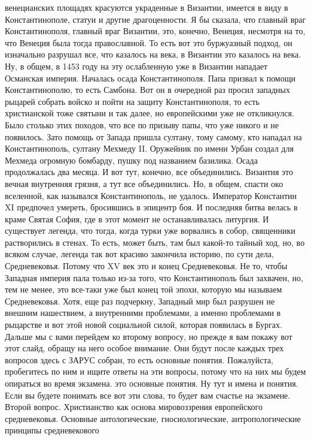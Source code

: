 венецианских площадях красуются украденные в Византии, имеется в виду в
Константинополе, статуи и другие драгоценности. Я бы сказала, что главный враг
Константинополя, главный враг Византии, это, конечно, Венеция, несмотря на то,
что Венеция была тогда православной. То есть вот это буржуазный подход, он
изначально разрушал все, что казалось на века, в Византии это казалось на века.
Ну, в общем, в 1453 году на эту ослабленную уже в Византии нападает Османская
империя. Началась осада Константинополя. Папа призвал к помощи Константинополю,
то есть Самбона. Вот он в очередной раз просил западных рыцарей собрать войско и
пойти на защиту Константинополя, то есть христианской тоже святыни и так далее,
но европейскими уже не откликнулся. Было столько этих походов, что все по
призыву папы, что уже никого и не появилось. Зато помощь от Запада пришла
султану, тому самому, кто нападал на Константинополь, султану Мехмеду II.
Оружейник по имени Урбан создал для Мехмеда огромную бомбарду, пушку под
названием базилика. Осада продолжалась два месяца. И вот тут, конечно, все
объединились. Византия это вечная внутренняя грязня, а тут все объединились. Но,
в общем, спасти око вселенной, как назывался Константинополь, не удалось.
Император Константин XI предпочел умереть, бросившись в эпицентр боя. И
последняя битва велась в краме Святая София, где в этот момент не
останавливалась литургия. И существует легенда, что тогда, когда турки уже
ворвались в собор, священники растворились в стенах. То есть, может быть, там
был какой-то тайный ход, но, во всяком случае, легенда так вот красиво закончила
историю, по сути дела, Средневековья. Потому что XV век это и конец
Средневековья. Не то, чтобы Западная империя пала только из-за того, что
Константинополь был захвачен, но, тем не менее, это все-таки уже был конец той
эпохи, которую мы называем Средневековья. Хотя, еще раз подчеркну, Западный мир
был разрушен не внешним нашествием, а внутренними проблемами, а именно
проблемами в рыцарстве и вот этой новой социальной силой, которая появилась в
Бургах. Дальше мы с вами перейдем ко второму вопросу, но прежде я вам покажу вот
этот слайд, обращу на него особое внимание. Они будут после каждых трех вопросов
здесь с ЗАРУС собран, то есть основные понятия. Пожалуйста, пробегитесь по ним и
ищите ответы на эти вопросы, потому что на них мы будем опираться во время
экзамена. это основные понятия. Ну тут и имена и понятия. Если вы будете
понимать все вот эти слова, то будет вам счастье на экзамене. Второй вопрос.
Христианство как основа мировоззрения европейского средневековья. Основные
антологические, гносиологические, антропологические принципы средневекового
